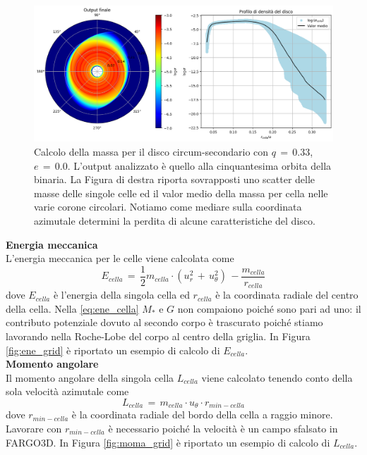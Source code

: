 \begin{figure}[H]
    \centering
    \includegraphics[width=\textwidth]{Immagini/Simulazioni/cal_mass.png}
    \caption{Calcolo della massa per il disco circum-secondario con $q\,=\,0.33$, $e\,=\,0.0$. L'output analizzato è quello alla cinquantesima orbita della binaria. La Figura di destra riporta sovrapposti uno scatter delle masse delle singole celle ed il valor medio della massa per cella nelle varie corone circolari. Notiamo come mediare sulla coordinata azimutale determini la perdita di alcune caratteristiche del disco.}
    \label{fig:mass_grid}
\end{figure}

\textbf{Energia meccanica}\\

L'energia meccanica per le celle viene calcolata come
\begin{equation}
E_{cella}\,=\,\frac{1}{2}m_{cella} \cdot(u_r^2\,+\,u_\theta^2)\,-\frac{m_{cella}}{r_{cella}}
\label{eq:ene_cella}
\end{equation}
dove $E_{cella}$ è l'energia della singola cella ed $r_{cella}$ è la coordinata radiale del centro della cella.
Nella \eqref{eq:ene_cella} $M_\ast$ e $G$ non compaiono poiché sono pari ad uno: il contributo potenziale dovuto al secondo corpo è trascurato poiché stiamo lavorando nella Roche-Lobe del corpo al centro della griglia.
In Figura \ref{fig:ene_grid} è riportato un esempio di calcolo di $E_{cella}$.\\

\textbf{Momento angolare}\\

Il momento angolare della singola cella $L_{cella}$ viene calcolato tenendo conto della sola velocità azimutale come
\begin{equation}
L_{cella}\,=\,m_{cella} \cdot u_\theta \cdot r_{min-cella}
\label{eq:moma_cella}
\end{equation}
dove $r_{min-cella}$ è la coordinata radiale del bordo della cella a raggio minore. Lavorare con $r_{min-cella}$ è necessario poiché la velocità è un campo sfalsato in FARGO3D. In Figura \ref{fig:moma_grid} è riportato un esempio di calcolo di $L_{cella}$.

